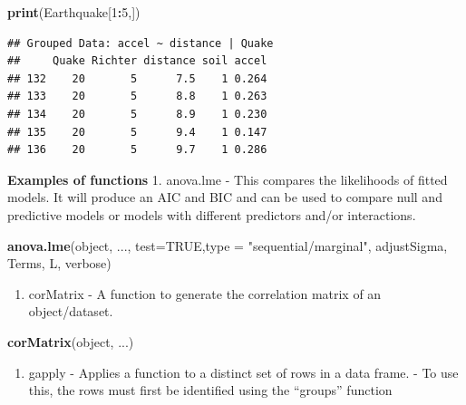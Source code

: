 \documentclass[]{book}
\newenvironment{Shaded}{\begin{snugshade}}{\end{snugshade}}
\newcommand{\DataTypeTok}[1]{\textcolor[rgb]{0.13,0.29,0.53}{#1}}
\newcommand{\DecValTok}[1]{\textcolor[rgb]{0.00,0.00,0.81}{#1}}
\newcommand{\KeywordTok}[1]{\textcolor[rgb]{0.13,0.29,0.53}{\textbf{#1}}}
\newcommand{\NormalTok}[1]{#1}
\newcommand{\OperatorTok}[1]{\textcolor[rgb]{0.81,0.36,0.00}{\textbf{#1}}}
\newcommand{\OtherTok}[1]{\textcolor[rgb]{0.56,0.35,0.01}{#1}}
\newcommand{\StringTok}[1]{\textcolor[rgb]{0.31,0.60,0.02}{#1}}
\providecommand{\tightlist}{%
  \setlength{\itemsep}{0pt}\setlength{\parskip}{0pt}}
\begin{document}
\begin{Shaded}
\begin{Highlighting}[]
\KeywordTok{print}\NormalTok{(Earthquake[}\DecValTok{1}\OperatorTok{:}\DecValTok{5}\NormalTok{,])}
\end{Highlighting}
\end{Shaded}

\begin{verbatim}
## Grouped Data: accel ~ distance | Quake
##     Quake Richter distance soil accel
## 132    20       5      7.5    1 0.264
## 133    20       5      8.8    1 0.263
## 134    20       5      8.9    1 0.230
## 135    20       5      9.4    1 0.147
## 136    20       5      9.7    1 0.286
\end{verbatim}

\textbf{Examples of functions}
1. anova.lme
- This compares the likelihoods of fitted models. It will produce an AIC and BIC and can be used to compare null and predictive models or models with different predictors and/or interactions.

\begin{Shaded}
\begin{Highlighting}[]
\KeywordTok{anova.lme}\NormalTok{(object, ..., }\DataTypeTok{test=}\OtherTok{TRUE}\NormalTok{,}\DataTypeTok{type =} \StringTok{"sequential/marginal"}\NormalTok{, adjustSigma, Terms, L, verbose)}
\end{Highlighting}
\end{Shaded}

\begin{enumerate}
\def\labelenumi{\arabic{enumi}.}
\setcounter{enumi}{1}
\tightlist
\item
  corMatrix
  - A function to generate the correlation matrix of an object/dataset.
\end{enumerate}

\begin{Shaded}
\begin{Highlighting}[]
\KeywordTok{corMatrix}\NormalTok{(object, ...)}
\end{Highlighting}
\end{Shaded}

\begin{enumerate}
\def\labelenumi{\arabic{enumi}.}
\setcounter{enumi}{2}
\tightlist
\item
  gapply
  - Applies a function to a distinct set of rows in a data frame.
  - To use this, the rows must first be identified using the ``groups'' function
\end{enumerate}
\end{document}
